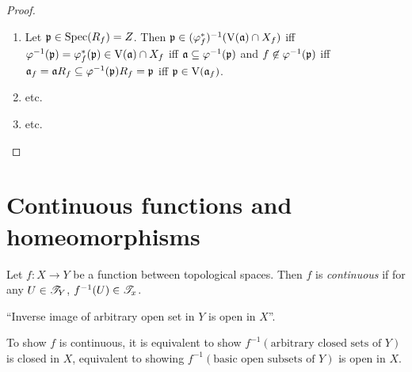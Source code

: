 \begin{proof}
    \begin{enumerate}
        \item Let $\mathfrak{p} \in \operatorname{Spec}(R_f) = Z$. Then $\mathfrak{p} \in (\varphi_f^*)^{-1}(\operatorname{V}(\mathfrak{a}) \cap X_f)$ iff $\varphi^{-1}(\mathfrak{p}) = \varphi_f^*(\mathfrak{p}) \in \operatorname{V}(\mathfrak{a}) \cap X_f$ iff $\mathfrak{a} \subseteq \varphi^{-1}(\mathfrak{p})$ and $f \not \in \varphi^{-1}(\mathfrak{p})$ iff $\mathfrak{a}_f = \mathfrak{a} R_f \subseteq \varphi^{-1}(\mathfrak{p})R_f = \mathfrak{p}$ iff $\mathfrak{p} \in \operatorname{V}(\mathfrak{a}_f)$.
        \item etc.
        \item etc. \qedhere
    \end{enumerate}
\end{proof}

\section{Continuous functions and homeomorphisms}

\begin{definition}
    Let $f: X \to Y$ be a function between topological spaces. Then $f$ is \emph{continuous} if for any $U \in \mathscr{T}_Y$, $f^{-1}(U) \in \mathscr{T}_x$. \par 
    ``Inverse image of arbitrary open set in $Y$ is open in $X$''. 
\end{definition}

\begin{fact}
    To show $f$ is continuous, it is equivalent to show $f^{-1}(\text{arbitrary closed sets of $Y$})$ is closed in $X$, equivalent to showing $f^{-1}(\text{basic open subsets of $Y$})$ is open in $X$.
\end{fact}

\begin{theorem}

\end{theorem}
